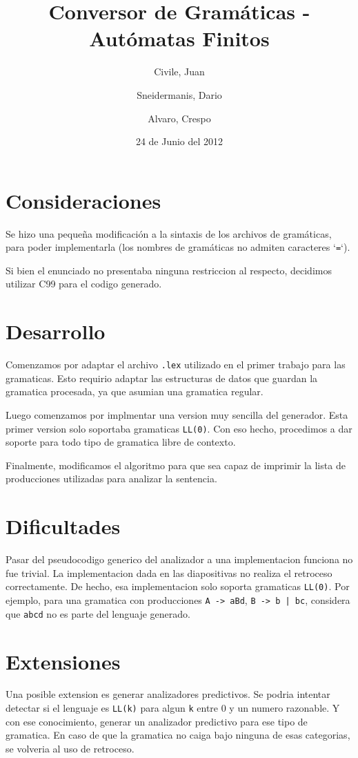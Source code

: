 \documentclass[11pt,a4paper,titlepage]{article}
\title{Conversor de Gramáticas - Autómatas Finitos}
\author{Civile, Juan \and Sneidermanis, Dario \and Alvaro, Crespo}
\date{24 de Junio del 2012}
\begin{document}
\newcommand{\awesome}[1]{\texttt{\large #1}}

\maketitle
\tableofcontents
\clearpage

\section{Consideraciones}
Se hizo una pequeña modificación a la sintaxis de los archivos de gramáticas, para poder implementarla (los nombres de gramáticas no admiten caracteres `\texttt{=}`).

Si bien el enunciado no presentaba ninguna restriccion al respecto, decidimos utilizar C99 para el codigo generado.

\section{Desarrollo}
Comenzamos por adaptar el archivo \texttt{.lex} utilizado en el primer trabajo para las gramaticas.
Esto requirio adaptar las estructuras de datos que guardan la gramatica procesada, ya que asumian una gramatica regular.

Luego comenzamos por implmentar una version muy sencilla del generador.
Esta primer version solo soportaba gramaticas \texttt{LL(0)}.
Con eso hecho, procedimos a dar soporte para todo tipo de gramatica libre de contexto.

Finalmente, modificamos el algoritmo para que sea capaz de imprimir la lista de producciones utilizadas para analizar la sentencia.

\section{Dificultades}
Pasar del pseudocodigo generico del analizador a una implementacion funciona no fue trivial.
La implementacion dada en las diapositivas no realiza el retroceso correctamente.
De hecho, esa implementacion solo soporta gramaticas \texttt{LL(0)}.
Por ejemplo, para una gramatica con producciones \texttt{A -> aBd}, \texttt{B -> b | bc}, considera que \texttt{abcd} no es parte del lenguaje generado.


\section{Extensiones}
Una posible extension es generar analizadores predictivos.
Se podria intentar detectar si el lenguaje es \texttt{LL(k)} para algun \texttt{k} entre 0 y un numero razonable.
Y con ese conocimiento, generar un analizador predictivo para ese tipo de gramatica.
En caso de que la gramatica no caiga bajo ninguna de esas categorias, se volveria al uso de retroceso.
\end{document}
